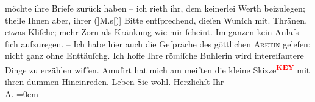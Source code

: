 \begin{ledgroupsized}[t]{13cm}
                  {\pb}möchte ihre Briefe zurück haben – ich
               rieth ihr, dem keinerlei Werth beizulegen; theile Ihnen aber, ihrer \introOben{}{[}({]}M.s{[}){]}\introOben{} Bitte entſprechend, dieſen Wunſch mit. Thränen, etwas Kliſche; mehr Zorn als
               Kränkung wie mir ſcheint. Im ganzen kein Anlaſs ſich aufzuregen. \pend
           \pstart
           – Ich habe hier auch die Geſpräche des göttlichen {\pb}\textsc{Aretin} geleſen; nicht ganz ohne Enttäuſchg. Ich hoffe Ihre rö\textcolor{gray}{mi}ſche
               Buhlerin wird intereſſantere Dinge zu erzählen wiſſen. Amuſirt hat mich am meiſten
               die kleine Skizze\textcolor{red}{\textsuperscript{\textbf{KEY}}} mit ihren dummen
                  Hineinreden. \pend
           \pstart
           Leben Sie wohl. Herzlichſt Ihr {\\[\baselineskip]}\spacefill\mbox{A.}\pend
           \leftskip=0em{}
         
         \endnumbering{}\end{ledgroupsized}\begin{anhang}\end{anhang}\newcommand{\dateiname}{L02981}\newcommand{\titel}{Arthur Schnitzler an Felix Salten, 4. 3. 1903}\newcommand{\editorInnen}{Martin Anton Müller und Laura Untner}
      